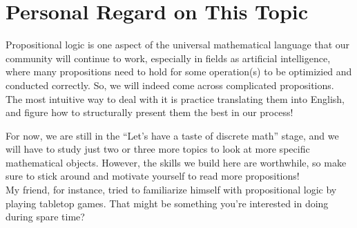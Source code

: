 \section{Personal Regard on This Topic}
Propositional logic is one aspect of the universal mathematical language that our community will continue to work, especially in fields as artificial intelligence, where many propositions need to hold for some operation(s) to be optimizied and conducted correctly. So, we will indeed come across complicated propositions. \\
The most intuitive way to deal with it is practice translating them into English, and figure how to structurally present them the best in our process!

For now, we are still in the ``Let's have a taste of discrete math'' stage, and we will have to study just two or three more topics to look at more specific mathematical objects. However, the skills we build here are worthwhile, so make sure to stick around and motivate yourself to read more propositions! \\
My friend, for instance, tried to familiarize himself with propositional logic by playing tabletop games. That might be something you're interested in doing during spare time?
